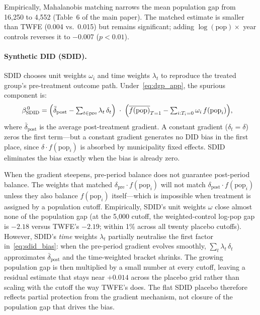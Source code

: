 \documentclass[12pt,letterpaper]{article}
\begin{document}
Empirically, Mahalanobis matching narrows the mean population gap from 16,250 to 4,552 (Table~6 of the main paper). The matched estimate is smaller than TWFE (0.004 vs.\ 0.015) but remains significant; adding $\log(\text{pop}) \times$ year controls reverses it to $-$0.007 ($p < 0.01$).

\paragraph{Synthetic DID (SDID).} SDID chooses unit weights $\omega_i$ and time weights $\lambda_t$ to reproduce the treated group's pre-treatment outcome path. Under~\eqref{eq:dgp_app}, the spurious component is:
%
\begin{align}
  \beta^{\,0}_{\text{SDID}}
  &= \Bigl(\bar\delta_{\text{post}} - \textstyle\sum_{t \in \text{pre}} \lambda_t\, \delta_t\Bigr)
     \;\cdot\;
     \Bigl(\overline{f(\text{pop})}_{T=1} - \textstyle\sum_{i:T_i=0} \omega_i\, f(\text{pop}_i)\Bigr),
  \label{eq:sdid_bias}
\end{align}
%
where $\bar\delta_{\text{post}}$ is the average post-treatment gradient. A constant gradient ($\delta_t = \delta$) zeros the first term---but a constant gradient generates no DID bias in the first place, since $\delta \cdot f(\text{pop}_i)$ is absorbed by municipality fixed effects. SDID eliminates the bias exactly when the bias is already zero.

When the gradient steepens, pre-period balance does not guarantee post-period balance. The weights that matched $\delta_{\text{pre}} \cdot f(\text{pop}_i)$ will not match $\delta_{\text{post}} \cdot f(\text{pop}_i)$ unless they also balance $f(\text{pop}_i)$ itself---which is impossible when treatment is assigned by a population cutoff. Empirically, SDID's unit weights $\omega$ close almost none of the population gap (at the 5,000 cutoff, the weighted-control log-pop gap is $-2.18$ versus TWFE's $-2.19$; within 1\% across all twenty placebo cutoffs). However, SDID's \textit{time} weights $\lambda_t$ partially neutralise the first factor in~\eqref{eq:sdid_bias}: when the pre-period gradient evolves smoothly, $\sum_t \lambda_t \,\delta_t$ approximates $\bar\delta_{\text{post}}$ and the time-weighted bracket shrinks. The growing population gap is then multiplied by a small number at every cutoff, leaving a residual estimate that stays near $+0.014$ across the placebo grid rather than scaling with the cutoff the way TWFE's does. The flat SDID placebo therefore reflects partial protection from the gradient mechanism, not closure of the population gap that drives the bias.
\end{document}
